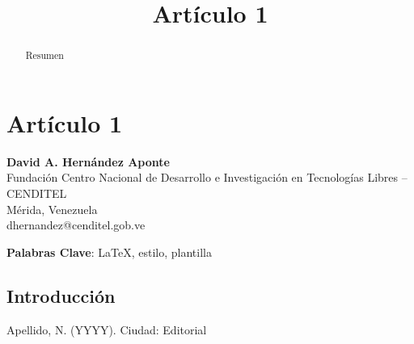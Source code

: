 \newpage
\title{Artículo 1}
\section{Artículo 1}

\begin{center}
\textbf{David A. Hernández Aponte} \\
Fundación Centro Nacional de Desarrollo e Investigación en Tecnologías Libres -- CENDITEL\\
Mérida, Venezuela\\
dhernandez@cenditel.gob.ve
\end{center}

\begin{abstract}
Resumen
\end{abstract}

\textbf{Palabras Clave}: \LaTeX, estilo, plantilla

\subsection{Introducción}


\begin{thebibliography}{9}


 Apellido, N. (YYYY).
\newblock Ciudad:
\newblock Editorial


\end{thebibliography}


%